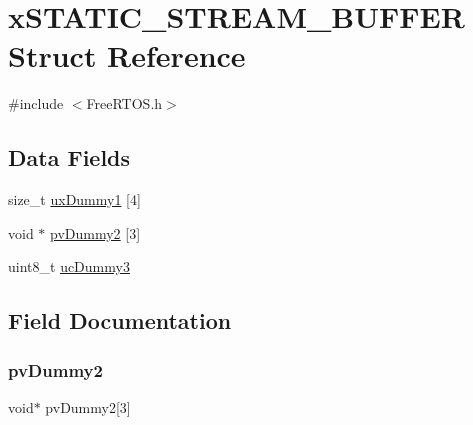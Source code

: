 \hypertarget{structx_s_t_a_t_i_c___s_t_r_e_a_m___b_u_f_f_e_r}{}\section{x\+S\+T\+A\+T\+I\+C\+\_\+\+S\+T\+R\+E\+A\+M\+\_\+\+B\+U\+F\+F\+ER Struct Reference}
\label{structx_s_t_a_t_i_c___s_t_r_e_a_m___b_u_f_f_e_r}


{\ttfamily \#include $<$Free\+R\+T\+O\+S.\+h$>$}

\subsection*{Data Fields}
\begin{DoxyCompactItemize}
\item 
size\+\_\+t \mbox{\hyperlink{structx_s_t_a_t_i_c___s_t_r_e_a_m___b_u_f_f_e_r_ab6fc664a4122a009b76b08d097efa964}{ux\+Dummy1}} \mbox{[}4\mbox{]}
\item 
void $\ast$ \mbox{\hyperlink{structx_s_t_a_t_i_c___s_t_r_e_a_m___b_u_f_f_e_r_a6f791759d30607050df1ea8ff6032a28}{pv\+Dummy2}} \mbox{[}3\mbox{]}
\item 
uint8\+\_\+t \mbox{\hyperlink{structx_s_t_a_t_i_c___s_t_r_e_a_m___b_u_f_f_e_r_a54af15ad0267f63fab42e6c6f1bc2c99}{uc\+Dummy3}}
\end{DoxyCompactItemize}


\subsection{Field Documentation}
\mbox{\label{structx_s_t_a_t_i_c___s_t_r_e_a_m___b_u_f_f_e_r_a6f791759d30607050df1ea8ff6032a28}} 
\subsubsection{\texorpdfstring{pvDummy2}{pvDummy2}}
{\footnotesize\ttfamily void$\ast$ pv\+Dummy2\mbox{[}3\mbox{]}}

\mbox{\label{structx_s_t_a_t_i_c___s_t_r_e_a_m___b_u_f_f_e_r_a54af15ad0267f63fab42e6c6f1bc2c99}} 
